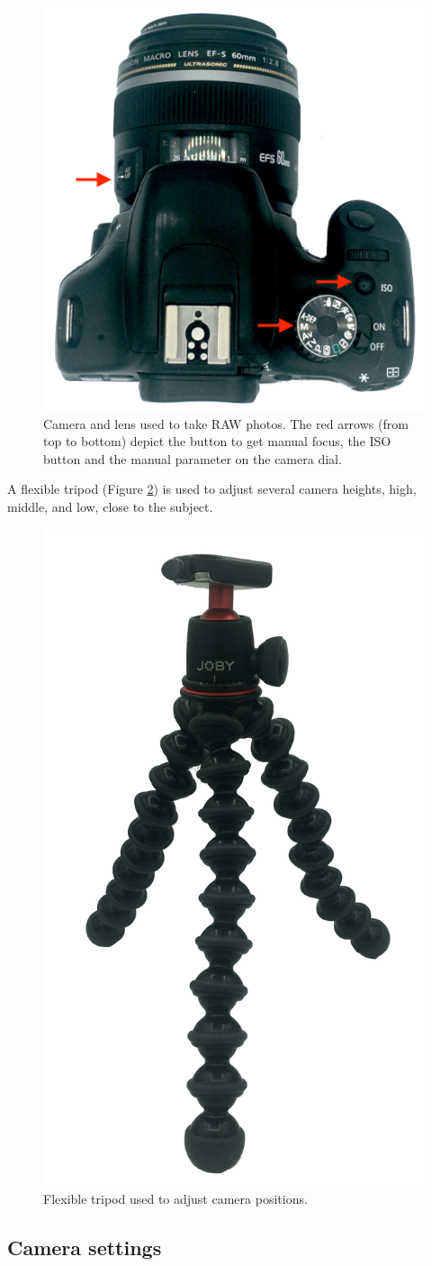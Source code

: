 \documentclass[
]{book}
\begin{document}
\begin{figure}

{\centering \includegraphics[width=0.33\linewidth]{Figures/camera_arrows} 

}

\caption{Camera and lens used to take RAW photos. The red arrows (from top to bottom) depict the button to get manual focus, the ISO button and the manual parameter on the camera dial.}\label{fig:camera-arrows}
\end{figure}

A flexible tripod (Figure \ref{fig:tripod}) is used to adjust several camera heights, high, middle, and low, close to the subject.

\begin{figure}

{\centering \includegraphics[width=0.33\linewidth]{Figures/tripod} 

}

\caption{Flexible tripod used to adjust camera positions.}\label{fig:tripod}
\end{figure}

\hypertarget{camera-settings}{%
\subsection{Camera settings}\label{camera-settings}}
\end{document}

